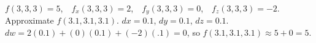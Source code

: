{$f(3,3,3) = 5$,\ \ $f_x(3,3,3) = 2$,\ \ $f_y(3,3,3) = 0$,\ \ $f_z(3,3,3) = -2$. Approximate $f(3.1, 3.1,3.1)$.
}
{$dx = 0.1$, $dy = 0.1$, $dz = 0.1$.\\
$dw = 2(0.1) + (0)(0.1) + (-2)(.1) = 0$, so $f(3.1,3.1,3.1) \approx 5+0=5$.
}